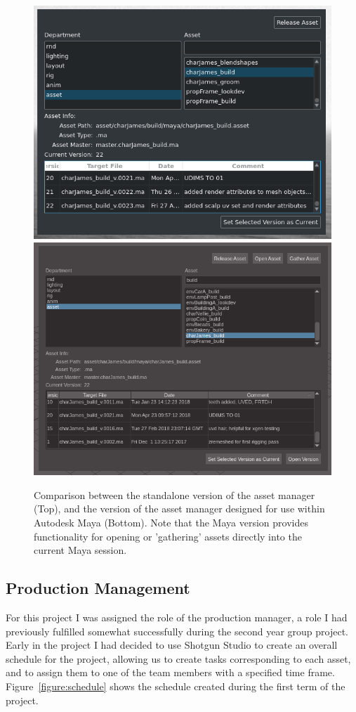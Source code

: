 \documentclass[11pt]{article}
\begin{document}
\begin{figure}[htbp]
\centering
\includegraphics[width=0.8\linewidth]{images/amStandalone.png}
\includegraphics[width=0.8\linewidth]{images/amGuiMaya.png}
\caption{\label{figure:assetManagerGui} Comparison between the standalone version of the asset manager (Top), and the version of the asset manager designed for use within Autodesk Maya (Bottom). Note that the Maya version provides functionality for opening or 'gathering' assets directly into the current Maya session.}
\end{figure}

\subsection{Production Management}


For this project I was assigned the role of the production manager, a role I had previously fulfilled somewhat successfully during the second year group project. Early in the project I had decided to use Shotgun Studio to create an overall schedule for the project, allowing us to create tasks corresponding to each asset, and to assign them to one of the team members with a specified time frame. Figure~\ref{figure:schedule} shows the schedule created during the first term of the project.
\end{document}
